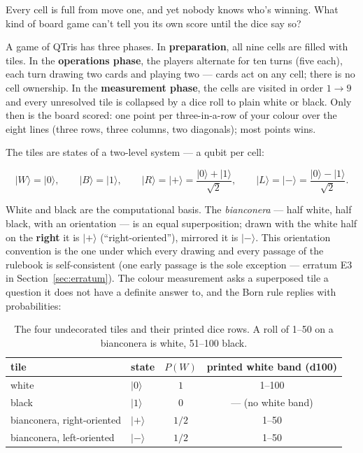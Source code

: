 \documentclass[a4paper,11pt]{article}
\providecommand{\ket}[1]{|#1\rangle}
\begin{document}
\begin{questionbox}
Every cell is full from move one, and yet nobody knows who's winning. What kind of
board game can't tell you its own score until the dice say so?
\end{questionbox}

A game of QTris has three phases. In \textbf{preparation}, all nine cells are filled
with tiles. In the \textbf{operations phase}, the players alternate for ten turns (five
each), each turn drawing two cards and playing two --- cards act on any cell; there is
no cell ownership. In the \textbf{measurement phase}, the cells are visited in order
$1 \to 9$ and every unresolved tile is collapsed by a dice roll to plain white or
black. Only then is the board scored: one point per three-in-a-row of your colour over
the eight lines (three rows, three columns, two diagonals); most points wins.

The tiles are states of a two-level system --- a qubit per cell:

\begin{equation}
    \ket{W} = \ket{0}, \qquad \ket{B} = \ket{1}, \qquad
    \ket{R} = \ket{+} = \frac{\ket{0} + \ket{1}}{\sqrt 2}, \qquad
    \ket{L} = \ket{-} = \frac{\ket{0} - \ket{1}}{\sqrt 2}.
    \label{eq:tiles}
\end{equation}

White and black are the computational basis. The \emph{bianconera} --- half white,
half black, with an orientation --- is an equal superposition; drawn with the white half
on the \textbf{right} it is $\ket{+}$ (``right-oriented''), mirrored it is $\ket{-}$.
This orientation convention is the one under which every drawing and every passage of
the rulebook is self-consistent (one early passage is the sole exception --- erratum E3
in Section~\ref{sec:erratum}). The colour measurement asks a superposed tile a question
it does not have a definite answer to, and the Born rule replies with probabilities:

\begin{table}[H]
\centering
\begin{tabular}{llcc}
\toprule
tile & state & $P(W)$ & printed white band (d100) \\
\midrule
white & $\ket{0}$ & $1$ & 1--100 \\
black & $\ket{1}$ & $0$ & --- (no white band) \\
bianconera, right-oriented & $\ket{+}$ & $1/2$ & 1--50 \\
bianconera, left-oriented & $\ket{-}$ & $1/2$ & 1--50 \\
\bottomrule
\end{tabular}
\caption{The four undecorated tiles and their printed dice rows. A roll of 1--50 on a
bianconera is white, 51--100 black.}
\label{tab:tiles}
\end{table}
\end{document}
